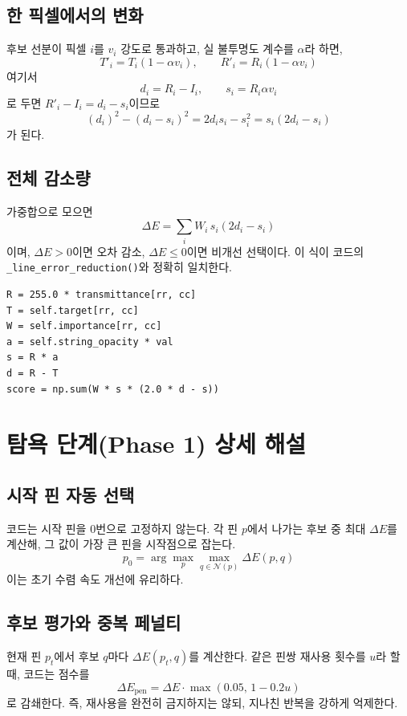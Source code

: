 \documentclass[11pt,a4paper]{article}
\begin{document}
\subsection{한 픽셀에서의 변화}
후보 선분이 픽셀 \(i\)를 \(v_i\) 강도로 통과하고,
실 불투명도 계수를 \(\alpha\)라 하면,
\begin{equation}
T'_i=T_i(1-\alpha v_i),\qquad
R'_i=R_i(1-\alpha v_i)
\end{equation}
여기서
\begin{equation}
d_i=R_i-I_i,\qquad s_i=R_i\alpha v_i
\end{equation}
로 두면 \(R'_i-I_i=d_i-s_i\)이므로
\begin{equation}
(d_i)^2-(d_i-s_i)^2 = 2d_is_i-s_i^2=s_i(2d_i-s_i)
\end{equation}
가 된다.

\subsection{전체 감소량}
가중합으로 모으면
\begin{equation}
\Delta E = \sum_i W_i\,s_i(2d_i-s_i)
\end{equation}
이며,
\(\Delta E>0\)이면 오차 감소, \(\Delta E\le 0\)이면 비개선 선택이다.
이 식이 코드의 \texttt{\_line\_error\_reduction()}와 정확히 일치한다.

\begin{lstlisting}[caption={실제 점수 계산 핵심 (요약)}]
R = 255.0 * transmittance[rr, cc]
T = self.target[rr, cc]
W = self.importance[rr, cc]
a = self.string_opacity * val
s = R * a
d = R - T
score = np.sum(W * s * (2.0 * d - s))
\end{lstlisting}

\section{탐욕 단계(Phase 1) 상세 해설}
\subsection{시작 핀 자동 선택}
코드는 시작 핀을 0번으로 고정하지 않는다.
각 핀 \(p\)에서 나가는 후보 중 최대 \(\Delta E\)를 계산해,
그 값이 가장 큰 핀을 시작점으로 잡는다.
\begin{equation}
p_0=\arg\max_p \max_{q\in\mathcal N(p)}\Delta E(p,q)
\end{equation}
이는 초기 수렴 속도 개선에 유리하다.

\subsection{후보 평가와 중복 페널티}
현재 핀 \(p_t\)에서 후보 \(q\)마다 \(\Delta E(p_t,q)\)를 계산한다.
같은 핀쌍 재사용 횟수를 \(u\)라 할 때,
코드는 점수를
\begin{equation}
\Delta E_{\mathrm{pen}}=\Delta E\cdot\max(0.05,\,1-0.2u)
\end{equation}
로 감쇄한다.
즉, 재사용을 완전히 금지하지는 않되,
지나친 반복을 강하게 억제한다.
\end{document}
